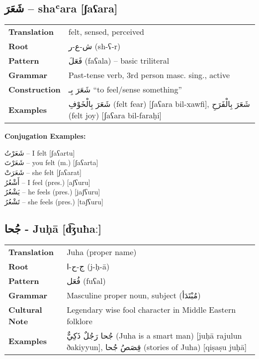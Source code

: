 \documentclass[a4paper,12pt]{article}
\begin{document}
\subsection{\textarabic{شَعَرَ} – \textbf{shaʿara} [ʃaʕara]}
\begin{tabular}{p{3cm}p{10cm}}
\toprule
\textbf{Translation} & felt, sensed, perceived\\
\textbf{Root} & \textarabic{ش-ع-ر} (sh-ʕ-r)\\
\textbf{Pattern} & \textarabic{فَعَلَ} (faʕala) – basic triliteral\\
\textbf{Grammar} & Past-tense verb, 3rd person masc. sing., active\\
\textbf{Construction} & \textarabic{شَعَرَ بِـ} “to feel/sense something”\\
\textbf{Examples} & \textarabic{شَعَرَ بِالْخَوْفِ} (felt fear) [ʃaʕara bil-xawfi], \textarabic{شَعَرَ بِالْفَرَحِ} (felt joy) [ʃaʕara bil-faraḥi]\\
\bottomrule
\end{tabular}

\textbf{Conjugation Examples:}
\begin{multicols}{2}
\small
\textarabic{شَعَرْتُ} – I felt [ʃaʕartu]\\
\textarabic{شَعَرْتَ} – you felt (m.) [ʃaʕarta]\\
\textarabic{شَعَرَتْ} – she felt [ʃaʕarat]\\
\textarabic{أَشْعُرُ} – I feel (pres.) [aʃʕuru]\\
\textarabic{يَشْعُرُ} – he feels (pres.) [jaʃʕuru]\\
\textarabic{تَشْعُرُ} – she feels (pres.) [taʃʕuru]
\end{multicols}

\subsection{\textarabic{جُحا} - \textbf{Juḥā} [d͡ʒuħaː]}

\begin{tabular}{p{3cm}p{10cm}}
\toprule
\textbf{Translation} & Juha (proper name) \\
\textbf{Root} & \textarabic{ج-ح-ا} (j-ḥ-ā) \\
\textbf{Pattern} & \textarabic{فُعَل} (fuʕal) \\
\textbf{Grammar} & Masculine proper noun, subject (\textarabic{مُبْتَدَأ}) \\
\textbf{Cultural Note} & Legendary wise fool character in Middle Eastern folklore \\
\textbf{Examples} & \textarabic{جُحا رَجُلٌ ذَكِيٌّ} (Juha is a smart man) [juḥā rajulun ðakiyyun], \textarabic{قِصَصُ جُحا} (stories of Juha) [qiṣaṣu juḥā] \\
\bottomrule
\end{tabular}
\end{document}
